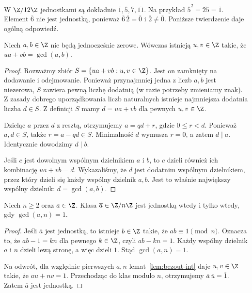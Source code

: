 \begin{przyklad}
W $\Z/12\Z$ jednostkami są dokładnie
$\overline1,\overline5,\overline7,\overline{11}$.
Na przykład $\overline5^2=\overline{25}=\overline1$.
Element $\overline6$ nie jest jednostką, ponieważ
$\overline6\,\overline2=\overline0$ i $\overline2\ne\overline0$.
Poniższe twierdzenie daje ogólną odpowiedź.
\end{przyklad}

\begin{lemat}
\label{lem:bezout-int}
Niech $a,b\in\Z$ nie będą jednocześnie zerowe. Wówczas istnieją
$u,v\in\Z$ takie, że $ua+vb=\gcd(a,b)$.
\end{lemat}
\begin{proof}
Rozważmy zbiór $S=\{ua+vb:u,v\in\Z\}$.
Jest on zamknięty na dodawanie i odejmowanie. Ponieważ przynajmniej
jedna z liczb $a,b$ jest niezerowa, $S$ zawiera pewną liczbę dodatnią
(w razie potrzeby zmieniamy znak). Z zasady dobrego uporządkowania
liczb naturalnych istnieje najmniejsza dodatnia liczba $d\in S$.
Z definicji $S$ mamy $d=ua+vb$ dla pewnych $u,v\in\Z$.

Dzieląc $a$ przez $d$ z resztą, otrzymujemy $a=qd+r$,
gdzie $0\le r<d$. Ponieważ $a,d\in S$, także $r=a-qd\in S$.
Minimalność $d$ wymusza $r=0$, a zatem $d\mid a$.
Identycznie dowodzimy $d\mid b$.

Jeśli $c$ jest dowolnym wspólnym dzielnikiem $a$ i $b$,
to $c$ dzieli również ich kombinację $ua+vb=d$.
Wykazaliśmy, że $d$ jest dodatnim wspólnym dzielnikiem,
przez który dzieli się każdy wspólny dzielnik $a,b$.
Jest to właśnie największy wspólny dzielnik: $d=\gcd(a,b)$.
\end{proof}

\begin{twierdzenie}
\label{tw:jednostki-mod}
Niech $n\ge2$ oraz $a\in\Z$. Klasa $\overline a\in\Z/n\Z$
jest jednostką wtedy i tylko wtedy, gdy $\gcd(a,n)=1$.
\end{twierdzenie}
\begin{proof}
Jeśli $\overline a$ jest jednostką, to istnieje $b\in\Z$ takie, że
$ab\equiv1\pmod n$. Oznacza to, że $ab-1=kn$ dla pewnego $k\in\Z$,
czyli $ab-kn=1$. Każdy wspólny dzielnik $a$ i $n$ dzieli lewą stronę,
a więc dzieli $1$. Stąd $\gcd(a,n)=1$.

Na odwrót, dla względnie pierwszych $a,n$ lemat~\ref{lem:bezout-int} daje $u,v\in\Z$ takie, że $au+nv=1$.
Przechodząc do klas modulo $n$, otrzymujemy
$\overline a\,\overline u=\overline1$. Zatem $\overline a$ jest jednostką.
\end{proof}

